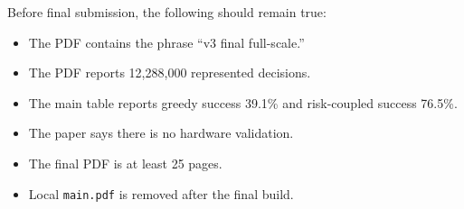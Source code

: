 \documentclass{article}
\begin{document}
Before final submission, the following should remain true:

\begin{itemize}
    \item The PDF contains the phrase ``v3 final full-scale.''
    \item The PDF reports 12,288,000 represented decisions.
    \item The main table reports greedy success 39.1\% and risk-coupled
    success 76.5\%.
    \item The paper says there is no hardware validation.
    \item The final PDF is at least 25 pages.
    \item Local \texttt{main.pdf} is removed after the final build.
\end{itemize}
\end{document}
